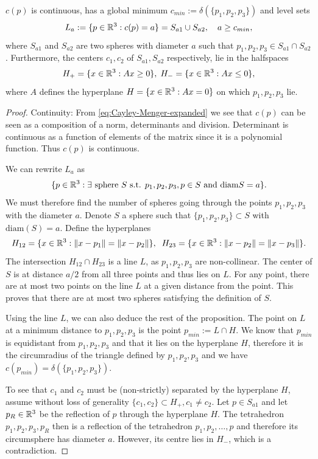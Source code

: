 \begin{lemma} $c(p)$ is continuous, has a global minimum $c_{min} := \delta(\{p_1,p_2,p_3\})$ and level sets 
	$$L_a := \{p \in {\mathbb R^3}: c(p)=a\} = S_{a1} \cup S_{a2}, \quad a \geq c_{min},$$ 
	where $S_{a1}$ and $S_{a2}$ are two spheres with diameter $a$ such that $p_1,p_2,p_3 \in S_{a1}\cap S_{a2}$. Furthermore, the centers $c_1, c_2$ of $S_{a1},S_{a2}$ respectively, lie in the halfspaces
$$H_+ = \{x \in {\mathbb R^3}: Ax \geq 0 \},\; H_- = \{x \in {\mathbb R^3}: Ax \leq 0\},$$
where $A$ defines the hyperplane $H=\{x\in{\mathbb R^3}: Ax = 0\}$ on which $p_1,p_2,p_3$ lie.
\end{lemma}
\begin{proof}
	Continuity: From \ref{eq:Cayley-Menger-expanded} we see that $c(p)$ can be seen as a composition of a norm, determinants and division. Determinant is continuous as a function of elements of the matrix since it is a polynomial function. Thus $c(p)$ is continuous.\newline

\noindent We can rewrite $L_a$ as
$$\{p \in {\mathbb R^3}: \exists \text{ sphere } S \text{ s.t. } p_1,p_2,p_3,p \in S \text{ and diam}S = a\}.$$
We must therefore find the number of spheres going through the points $p_1,p_2,p_3$ with the diameter $a$. Denote $S$ a sphere such that $\{p_1,p_2,p_3\}\subset S$ with $\mathrm{diam}(S)=a$. Define the hyperplanes
$$H_{12} = \{x\in{\mathbb R^3}: \|x-p_1\| = \|x-p_2\|\}, \;\; H_{23} = \{x\in{\mathbb R^3}: \|x-p_2\|=\|x-p_3\|\}.$$
The intersection $H_{12}\cap H_{23}$ is a line $L$, as $p_1,p_2,p_3$ are non-collinear.  The center of $S$ is at distance $a/2$ from all three points and thus lies on $L$. For any point, there are at most two points on the line $L$ at a given distance from the point. This proves that there are at most two spheres satisfying the definition of $S$.

Using the line $L$, we can also deduce the rest of the proposition. The point on $L$ at a minimum distance to $p_1,p_2,p_3$ is the point $p_{min}:=L\cap H$. We know that $p_{min}$ is equidistant from $p_1,p_2,p_3$ and that it lies on the hyperplane $H$, therefore it is the circumradius of the triangle defined by $p_1,p_2,p_3$ and we have $c(p_{min}) = \delta(\{p_1,p_2,p_3\})$.  

To see that $c_1$ and $c_2$ must be (non-strictly) separated by the hyperplane $H$, assume without loss of generality $\{c_1,c_2\}\subset H_+, c_1\neq c_2$. Let $p \in S_{a1}$ and let  $p_R\in {\mathbb R^3}$ be the reflection of $p$ through the hyperplane $H$. The tetrahedron $p_1,p_2,p_3,p_R$ then is a reflection of the tetrahedron $p_1,p_2,\dots, p$ and therefore its circumsphere has diameter $a$. However, its centre lies in $H_-$, which is a contradiction. 
\end{proof}

